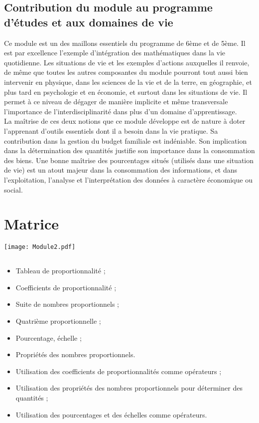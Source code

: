 \subsection{Contribution du module au programme d'études et aux domaines de vie}
Ce module est un des maillons essentiels du programme de 6ème et de 5ème. Il est par excellence l'exemple d'intégration des mathématiques dans la vie quotidienne. Les situations de vie et les exemples d'actions auxquelles il renvoie, de même que toutes les autres composantes du module pourront tout aussi bien intervenir en physique, dans les sciences de la vie et de la terre, en géographie, et plus tard en psychologie et en économie, et surtout dans les situations de vie. Il permet à ce niveau de dégager de manière implicite et même transversale l'importance de l'interdisciplinarité dans plus d'un domaine d'apprentissage.\\
La maîtrise de ces deux notions que ce module développe est de nature à doter l'apprenant d'outils essentiels dont il a besoin dans la vie pratique. Sa contribution dans la gestion du budget familiale est indéniable. Son implication dans la détermination des quantités justifie son importance dans la consommation des biens. Une bonne maîtrise des pourcentages situés (utilisés dans une situation de vie) est un atout majeur dans la consommation des informations, et dans l'exploitation, l'analyse et l'interprétation des données à caractère économique ou social.

\section{Matrice}

\texttt{[image: Module2.pdf]} 

\subsection*{}

\savoir
\begin{itemize}
\item Tableau de proportionnalité ;
\item Coefficients de proportionnalité ;
\item Suite de nombres proportionnels ;
\item Quatrième proportionnelle ;
\item Pourcentage, échelle ;
\item Propriétés des nombres proportionnels.
\end{itemize}
\savoirfaire
\begin{itemize}
\item Utilisation des coefficients de proportionnalités comme opérateurs ;
\item Utilisation des propriétés des nombres proportionnels pour déterminer des quantités ;
\item Utilisation des pourcentages et des échelles comme opérateurs.
\end{itemize}